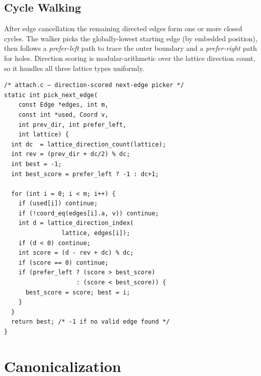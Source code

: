 \documentclass[10pt,a4paper]{article}
\newcommand{\file}[1]{\texttt{\footnotesize #1}}
\begin{document}
\subsection{Cycle Walking}

\begin{tcolorbox}[dualbox, title=Directed Cycle Extraction — \file{src/core/attach.c}]
  After edge cancellation the remaining directed edges form one or more
  closed cycles.  The walker picks the globally-lowest starting edge
  (by embedded position), then follows a \emph{prefer-left} path to
  trace the outer boundary and a \emph{prefer-right} path for holes.
  Direction scoring is modular-arithmetic over the lattice direction
  count, so it handles all three lattice types uniformly.
\tcblower
\begin{verbatim}
/* attach.c — direction-scored next-edge picker */
static int pick_next_edge(
    const Edge *edges, int m,
    const int *used, Coord v,
    int prev_dir, int prefer_left,
    int lattice) {
  int dc  = lattice_direction_count(lattice);
  int rev = (prev_dir + dc/2) % dc;
  int best = -1;
  int best_score = prefer_left ? -1 : dc+1;

  for (int i = 0; i < m; i++) {
    if (used[i]) continue;
    if (!coord_eq(edges[i].a, v)) continue;
    int d = lattice_direction_index(
                lattice, edges[i]);
    if (d < 0) continue;
    int score = (d - rev + dc) % dc;
    if (score == 0) continue;
    if (prefer_left ? (score > best_score)
                    : (score < best_score)) {
      best_score = score; best = i;
    }
  }
  return best; /* -1 if no valid edge found */
}
\end{verbatim}
\end{tcolorbox}

\section{Canonicalization}
\end{document}
